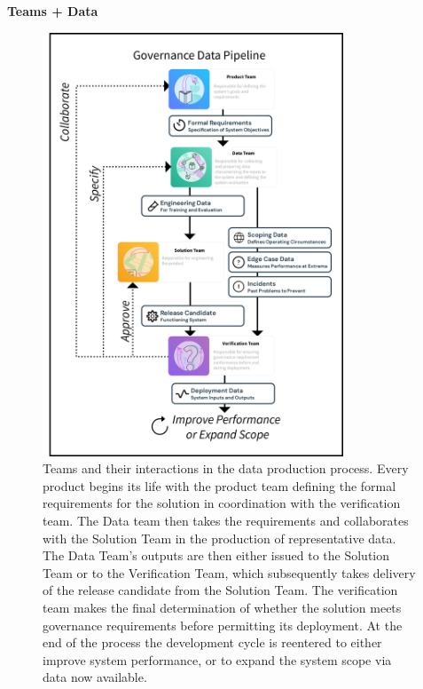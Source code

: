 \textbf{Teams + Data}


\begin{figure}[ht]
    \centering
    \includegraphics[width=0.80\textwidth]{images/PenpotPipeline.png}
    \caption{Teams and their interactions in the data production process. Every product begins its life with the product team defining the formal requirements for the solution in coordination with the verification team. The Data team then takes the requirements and collaborates with the Solution Team in the production of representative data. The Data Team's outputs are then either issued to the Solution Team or to the Verification Team, which subsequently takes delivery of the release candidate from the Solution Team. The verification team makes the final determination of whether the solution meets governance requirements before permitting its deployment. At the end of the process the development cycle is reentered to either improve system performance, or to expand the system scope via data now available.}
    \label{fig:data_pipeline}
\end{figure}

